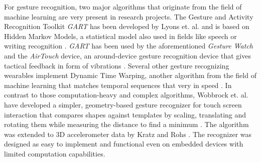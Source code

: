 For gesture recognition, two major algorithms that originate from the field of machine learning are very present in research projects. The Gesture and Activity Recognition Toolkit \textit{GART} has been developed by Lyons et. al. and is based on Hidden Markov Models, a statistical model also used in fields like speech or writing recognition \cite{Lyons2012}. \textit{GART} has been used by the aforementioned \textit{Gesture Watch} \cite{Kim2007} and the \textit{AirTouch} device, an around-device gesture recognition device that gives tactical feedback in form of vibrations \cite{Lee2011}. Several other gesture recognizing wearables implement Dynamic Time Warping, another algorithm from the field of machine learning that matches temporal sequences that very in speed \cite{Ashbrook2010} \cite{Liu2009}. In contrast to those computation-heavy and complex algorithms, Wobbrock et. al. have developed a simpler, geometry-based gesture recognizer for touch screen interaction that compares shapes against templates by scaling, translating and rotating them while measuring the distance to find a minimum \cite{Wobbrock2007}. The algorithm was extended to 3D accelerometer data by Kratz and Rohs \cite{Kratz2010}. The recognizer was designed as easy to implement and functional even on embedded devices with limited computation capabilities.